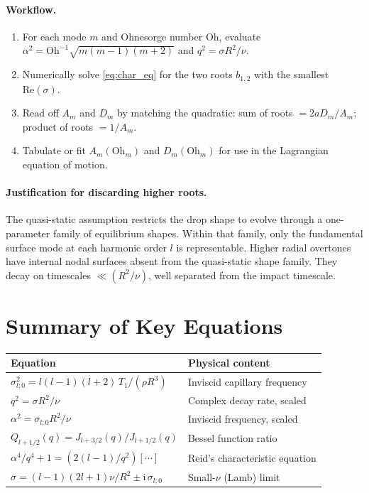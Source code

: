 \documentclass[12pt]{article}
\newcommand{\ii}{\mathrm{i}}
\theoremstyle{definition}
\begin{document}
\paragraph{Workflow.}
\begin{enumerate}
  \item For each mode $m$ and Ohnesorge number $\mathrm{Oh}$, evaluate
        $\alpha^2 = \mathrm{Oh}^{-1}\sqrt{m(m-1)(m+2)}$ and $q^2 = \sigma R^2/\nu$.
  \item Numerically solve \eqref{eq:char_eq} for the two roots $b_{1,2}$ with the
        smallest $\mathrm{Re}(\sigma)$.
  \item Read off $A_m$ and $D_m$ by matching the quadratic:
        sum of roots $= 2aD_m/A_m$; product of roots $= 1/A_m$.
  \item Tabulate or fit $A_m(\mathrm{Oh}_m)$ and $D_m(\mathrm{Oh}_m)$ for use in
        the Lagrangian equation of motion.
\end{enumerate}

\paragraph{Justification for discarding higher roots.} The quasi-static assumption
restricts the drop shape to evolve through a one-parameter family of equilibrium shapes.
Within that family, only the fundamental surface mode at each harmonic order $l$ is
representable. Higher radial overtones have internal nodal surfaces absent from the quasi-static shape family. They decay on timescales $\ll (R^2/\nu)$, well separated from the impact timescale.

\section{Summary of Key Equations}

\begin{center}
\begin{tabular}{ll}
  \toprule
  \textbf{Equation} & \textbf{Physical content} \\
  \midrule
  $\sigma_{l;0}^2 = l(l-1)(l+2)\,T_1/(\rho R^3)$ & Inviscid capillary frequency \\
  $q^2 = \sigma R^2/\nu$ & Complex decay rate, scaled \\
  $\alpha^2 = \sigma_{l;0}R^2/\nu$ & Inviscid frequency, scaled \\
  $Q_{l+1/2}(q) = J_{l+3/2}(q)/J_{l+1/2}(q)$ & Bessel function ratio \\
  $\alpha^4/q^4 + 1 = (2(l-1)/q^2)[\cdots]$ & Reid's characteristic equation \\
  $\sigma = (l-1)(2l+1)\nu/R^2 \pm \ii\,\sigma_{l;0}$ & Small-$\nu$ (Lamb) limit \\
  \bottomrule
\end{tabular}
\end{center}
\end{document}
